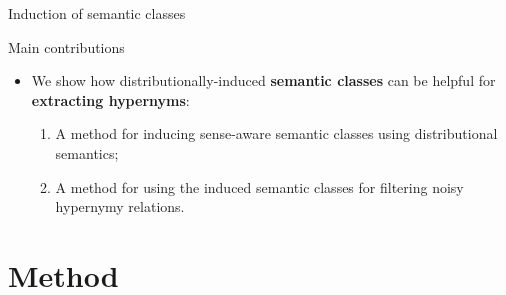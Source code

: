 \documentclass[usenames,dvipsnames]{beamer}
\begin{document}
\begin{frame}{Induction of semantic classes}

%

\end{frame}


\begin{frame}{Main contributions}

\begin{itemize}
	\item We show how distributionally-induced \alert{\textbf{semantic classes}} can be helpful  for \alert{\textbf{extracting hypernyms}}:
	\pause
	\vspace{10pt}
	\begin{enumerate}
		\item A method for \alert{inducing sense-aware semantic classes} using distributional semantics; 
		\vspace{10pt}
		\item A method for using the induced semantic classes for \alert{filtering noisy hypernymy relations}.
	 \end{enumerate}
\end{itemize}
\end{frame}

\section{Method}
\subsection{}
\end{document}
